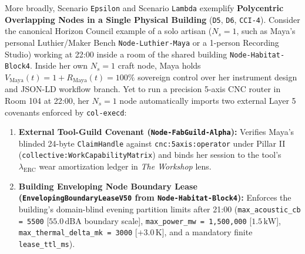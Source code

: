 More broadly, Scenario \texttt{Epsilon} and Scenario \texttt{Lambda} exemplify \textbf{Polycentric
Overlapping Nodes in a Single Physical Building} (\texttt{D5}, \texttt{D6}, \texttt{CCI-4}). Consider the
canonical Horizon Council example of a solo artisan ($N_s = 1$, such as Maya's personal Luthier/Maker
Bench \texttt{Node-Luthier-Maya} or a 1-person Recording Studio) working at 22:00 inside a room of the
shared building \texttt{Node-Habitat-Block4}. Inside her own $N_s = 1$ craft node, Maya holds
$V_{\mathrm{Maya}}(t) = 1 + R_{\mathrm{Maya}}(t) = 100\%$ sovereign control over her instrument design and
JSON-LD workflow branch. Yet to run a precision 5-axis CNC router in Room 104 at 22:00, her $N_s = 1$ node
automatically imports two external Layer 5 covenants enforced by \texttt{col-execd}:
\begin{enumerate}
    \item \textbf{External Tool-Guild Covenant (\texttt{Node-FabGuild-Alpha}):} Verifies Maya's blinded
    24-byte \texttt{ClaimHandle} against \texttt{cnc:5axis:operator} under Pillar II
    (\texttt{collective:WorkCapabilityMatrix}) and binds her session to the tool's $\lambda_{\mathrm{ERC}}$
    wear amortization ledger in \textit{The Workshop} lens.
    \item \textbf{Building Enveloping Node Boundary Lease (\texttt{EnvelopingBoundaryLeaseV50} from
    \texttt{Node-Habitat-Block4}):} Enforces the building's domain-blind evening partition limits after
    21:00 (\texttt{max\_acoustic\_cb = 5500} [$55.0\,\mathrm{dBA}$ boundary scale],
    \texttt{max\_power\_mw = 1,500,000} [$1.5\,\mathrm{kW}$], \texttt{max\_thermal\_delta\_mk = 3000}
    [$+3.0\,\mathrm{K}$], and a mandatory finite \texttt{lease\_ttl\_ms}).
\end{enumerate}

